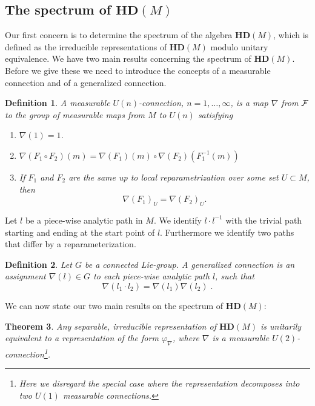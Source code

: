 \documentclass[12pt]{article}
\newtheorem{thm}{Theorem}[subsection]
\newtheorem{definition}[thm]{Definition}
\newcommand{\cF}{{\cal F}}
\begin{document}
\subsection{The spectrum of $\mathbf{HD}(M) $}

Our first concern is to determine the spectrum of the algebra $\mathbf{HD}(M) $, which is defined as 
 the irreducible representations of $\mathbf{HD}(M) $ modulo unitary equivalence. We have two main results concerning the spectrum of $\mathbf{HD}(M) $. Before we give these we need to introduce the concepts of a measurable connection and of a generalized connection.


\begin{definition}
A measurable $U(n)$-connection, $n=1,\ldots , \infty$, is a map $\nabla$ from $\cF$ to the group of measurable maps from $M$ to $U(n)$ satisfying
\begin{enumerate}
\item $\nabla (1)= 1$.
\item $\nabla (F_1 \circ F_2)(m)=\nabla (F_1) (m) \circ \nabla (F_2)(F_1^{-1}(m))$
\item If $F_1$ and $F_2$ are the same up to local reparametrization over some set $U\subset M$, then 
$$ \nabla ( F_1)_U= \nabla (F_2)_U  . $$ 
\end{enumerate} 
\end{definition}



Let $l$ be a piece-wise analytic path in $M$. We identify $l\cdot l^{-1}$ with the trivial path starting and ending at the start point of $l$. Furthermore we identify two paths that differ by a reparameterization. 
\begin{definition}
Let $G$ be a connected Lie-group. A generalized connection is an assignment $\nabla(l)\in G$ to each piece-wise analytic path $l$, such that
$$
\nabla(l_1\cdot l_2) = \nabla(l_1)\nabla(l_2)\;.
$$
\end{definition}


We can now state our two main results on the spectrum of $\mathbf{HD}(M) $:
\begin{thm}
\label{TH1}
Any separable, irreducible representation of $\mathbf{HD}(M) $ is unitarily equivalent to a representation of the form $\varphi_\nabla$, where $\nabla$ is a measurable $U(2)$-connection\footnote{Here we disregard the special case where the representation decomposes into two $U(1)$ measurable connections.}.
\end{thm}
\end{document}
